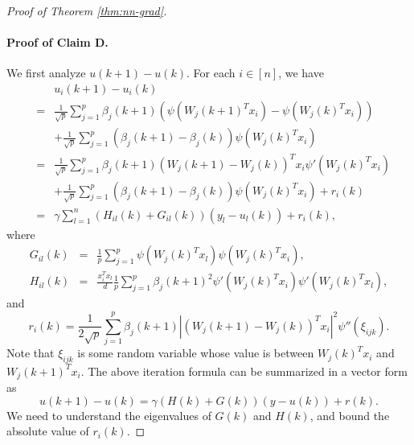 \begin{proof}[Proof of Theorem \ref{thm:nn-grad}]
\paragraph{Proof of Claim D.} 
We first analyze $u(k+1)-u(k)$. For each $i\in[n]$, we have
\begin{eqnarray*}
&& u_i(k+1) - u_i(k) \\
&=& \frac{1}{\sqrt{p}}\sum_{j=1}^p\beta_j(k+1)\left(\psi(W_j(k+1)^Tx_i)-\psi(W_j(k)^Tx_i)\right) \\
&& + \frac{1}{\sqrt{p}}\sum_{j=1}^p(\beta_j(k+1)-\beta_j(k))\psi(W_j(k)^Tx_i) \\
&=& \frac{1}{\sqrt{p}}\sum_{j=1}^p\beta_j(k+1)(W_j(k+1)-W_j(k))^Tx_i\psi'(W_j(k)^Tx_i) \\
&& + \frac{1}{\sqrt{p}}\sum_{j=1}^p(\beta_j(k+1)-\beta_j(k))\psi(W_j(k)^Tx_i) + r_i(k) \\
&=& \gamma\sum_{l=1}^n(H_{il}(k)+G_{il}(k))(y_l-u_l(k)) + r_i(k),
\end{eqnarray*}
where
\begin{eqnarray*}
G_{il}(k) &=& \frac{1}{p}\sum_{j=1}^p\psi(W_j(k)^Tx_l)\psi(W_j(k)^Tx_i), \\
H_{il}(k) &=& \frac{x_i^Tx_l}{d}\frac{1}{p}\sum_{j=1}^p\beta_j(k+1)^2\psi'(W_j(k)^Tx_i)\psi'(W_j(k)^Tx_l),
\end{eqnarray*}
and
$$r_i(k)=\frac{1}{2\sqrt{p}}\sum_{j=1}^p\beta_j(k+1)|(W_j(k+1)-W_j(k))^Tx_i|^2\psi''(\xi_{ijk}).$$
Note that $\xi_{ijk}$ is some random variable whose value is between $W_j(k)^Tx_i$ and $W_j(k+1)^Tx_i$. 
The above iteration formula can be summarized in a vector form as
\begin{equation}
u(k+1)-u(k)=\gamma(H(k)+G(k))(y-u(k))+r(k). \label{eq:iter-u-arctan}
\end{equation}
We need to understand the eigenvalues of $G(k)$ and $H(k)$, and bound the absolute value of $r_i(k)$.


\end{proof}
